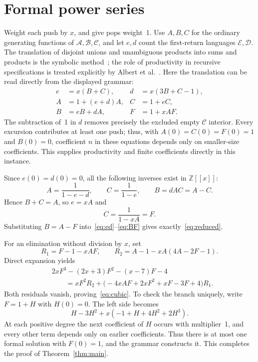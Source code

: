 \documentclass[11pt,a4paper]{article}
\theoremstyle{remark}
\newcommand{\Lang}[1]{\mathcal{#1}}
\newcommand{\Z}{\mathbb{Z}}
\begin{document}
\section{Formal power series}\label{sec:series}

Weight each push by $x$, and give pops weight~1. Use $A,B,C$ for the
ordinary generating functions of $\Lang A,\Lang B,\Lang C$, and let
$e,d$ count the first-return languages $\Lang E,\Lang D$. The translation
of disjoint unions and unambiguous products into sums and products is
the symbolic method~\cite[Chapter~I]{FlajoletSedgewick2009}; the role of
productivity in recursive specifications is treated explicitly by
Albert et al.~\cite[Sections~3.3, 4 and~5.2]{AlbertEtAl2026}.
Here the translation can be read directly from the displayed grammar:
\begin{align}
 e&=x(B+C),& d&=x(3B+C-1),\label{eq:ed}\\
 A&=1+(e+d)A,& C&=1+eC,\label{eq:AC}\\
 B&=eB+dA,& F&=1+xAF.\label{eq:BF}
\end{align}
The subtraction of~1 in $d$ removes precisely the excluded empty
$\Lang C$ interior. Every excursion contributes at least one push;
thus, with $A(0)=C(0)=F(0)=1$ and $B(0)=0$, coefficient $n$ in these
equations depends only on smaller-size coefficients. This supplies
productivity and finite coefficients directly in this instance.

Since $e(0)=d(0)=0$, all the following inverses exist in $\Z[[x]]$:
\[
 A=\frac1{1-e-d},\qquad C=\frac1{1-e},\qquad
 B=dAC=A-C.
\]
Hence $B+C=A$, so $e=xA$ and
\[
 C=\frac1{1-xA}=F.
\]
Substituting $B=A-F$ into~\eqref{eq:ed}--\eqref{eq:BF} gives
exactly~\eqref{eq:reduced}.

For an elimination without division by $x$, set
\[
 R_1=F-1-xAF,\qquad R_2=A-1-xA(4A-2F-1).
\]
Direct expansion yields
\begin{align*}
 &2xF^3-(2x+3)F^2-(x-7)F-4\\
 &\qquad=xF^2R_2+
 \bigl(-4xAF+2xF^2+xF-3F+4\bigr)R_1.
\end{align*}
Both residuals vanish, proving~\eqref{eq:cubic}. To check the branch
uniquely, write $F=1+H$ with $H(0)=0$. The left side becomes
\[
 H-3H^2+x(-1+H+4H^2+2H^3).
\]
At each positive degree the next coefficient of $H$ occurs with
multiplier~1, and every other term depends only on earlier coefficients.
Thus there is at most one formal solution with $F(0)=1$, and the grammar
constructs it. This completes the proof of Theorem~\ref{thm:main}.
\end{document}

